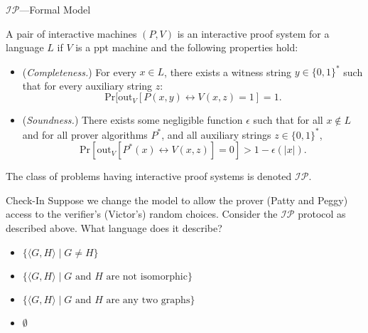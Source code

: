 \begin{frame}{$\mathcal{IP}$---Formal Model}
\vspace{-7pt}
    \begin{definition}
    A pair of interactive machines $(P, V)$ is an interactive proof system for a language $L$ if $V$ is a ppt machine and the following properties hold:
    \begin{itemize}
        \item (\textit{Completeness.}) For every $x \in L$, there exists a witness string $y \in \{0, 1\}^*$ such that for every auxiliary string $z$:
        \[\mathrm{Pr}[\mathrm{out}_V[P(x, y) \leftrightarrow V(x, z) = 1] = 1.\]
        \item (\textit{Soundness.}) There exists some negligible function $\epsilon$ such that for all $x \notin L$ and for all prover algorithms $P^*$, and all auxiliary strings $z \in \{0, 1\}^*$,
        \[\mathrm{Pr}[\mathrm{out}_V[P^*(x) \leftrightarrow V(x, z)] = 0] > 1 - \epsilon(|x|).\]
    \end{itemize}
    The class of problems having interactive proof systems is denoted $\mathcal{IP}$.
    \end{definition}
\end{frame}


\begin{frame}{Check-In}
    Suppose we change the model to allow the prover (Patty and Peggy) access to the verifier's (Victor's) random choices. Consider the $\mathcal{IP}$ protocol as described above. What language does it describe?
    \begin{itemize}
        \item $\{\langle G, H \rangle \mid G \neq H\}$
        \item $\{\langle G, H \rangle \mid G \text{ and } H \text{ are not isomorphic}\}$
        \item $\{\langle G, H \rangle \mid G \text{ and } H \text{ are any two graphs}\}$
        \item $\emptyset$
    \end{itemize}
\end{frame}




